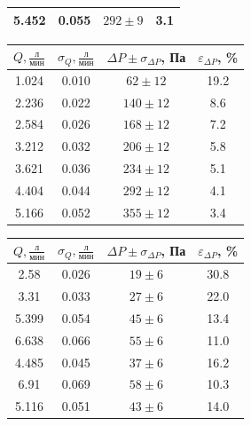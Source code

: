 \documentclass[a4paper]{article}
\begin{document}
\begin{enumerate}
\begin{multicols}{2}
\begin{center}
\begin{tabular}{|c|c|c|c|}
        5.452 & 0.055 & $292 \pm 9$ & 3.1 \\ \hline
    \end{tabular}
\end{center}
\vspace{1em}
\begin{center}
    \begin{tabular}{|c|c|c|c|}
        \hline
         $Q, \frac{\text{л}}{\text{мин}} $& $\sigma_Q, \frac{\text{л}}{\text{мин}} $& $\Delta P \pm \sigma_{\Delta P}$, Па & $\varepsilon_{\Delta P}$, \% \\
        \hline
        1.024 & 0.010 & $62 \pm 12$ & 19.2 \\ \hline
        2.236 & 0.022 & $140 \pm 12$ & 8.6 \\ \hline
        2.584 & 0.026 & $168 \pm 12$ & 7.2 \\ \hline
        3.212 & 0.032 & $206 \pm 12$ & 5.8 \\ \hline
        3.621 & 0.036 & $234 \pm 12$ & 5.1 \\ \hline
        4.404 & 0.044 & $292 \pm 12$ & 4.1 \\ \hline
        5.166 & 0.052 & $355 \pm 12$ & 3.4 \\ \hline
    \end{tabular}
\end{center}
\vspace{1em}
\begin{center}
    \begin{tabular}{|c|c|c|c|}
        \hline
         $Q, \frac{\text{л}}{\text{мин}} $& $\sigma_Q, \frac{\text{л}}{\text{мин}} $& $\Delta P \pm \sigma_{\Delta P}$, Па & $\varepsilon_{\Delta P}$, \% \\
        \hline
        2.58 & 0.026 & $19 \pm 6$ & 30.8 \\ \hline
        3.31 & 0.033 & $27 \pm 6$ & 22.0 \\ \hline
        5.399 & 0.054 & $45 \pm 6$ & 13.4 \\ \hline
        6.638 & 0.066 & $55 \pm 6$ & 11.0 \\ \hline
        4.485 & 0.045 & $37 \pm 6$ & 16.2 \\ \hline
        6.91 & 0.069 & $58 \pm 6$ & 10.3 \\ \hline
        5.116 & 0.051 & $43 \pm 6$ & 14.0 \\ \hline
    \end{tabular}

\end{center}
\end{multicols}
\end{enumerate}
\end{document}
